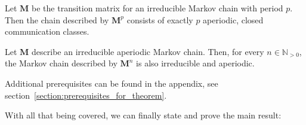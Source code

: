 \documentclass[../../main.tex]{subfiles}
\begin{document}
      \begin{lemma}
        \label{lemma:raising_marov_matrix_to_its_period}
        Let $\bm{M}$ be the transition matrix for an irreducible Markov chain with period $p$. Then the chain described by $\bm{M}^p$ consists of exactly $p$ aperiodic, closed communication classes.
    \end{lemma}

    \begin{lemma}
        \label{lemma:irreducible_aperiodic_markov_chain_stays_irreducible_aperiodic}
        Let $\bm{M}$ describe an irreducible aperiodic Markov chain. Then, for every $n \in \mathbb{N}_{>0}$, the Markov chain described by $\bm{M}^n$ is also irreducible and aperiodic.
    \end{lemma}

    Additional prerequisites can be found in the appendix, see section~\ref{section:prerequisites_for_theorem}.

    With all that being covered, we can finally state and prove the main result:
\end{document}
